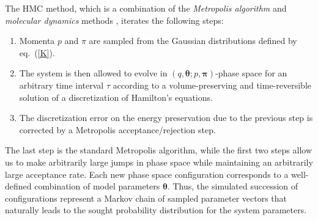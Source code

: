 \documentclass[12pt,a4paper,final]{iopart}
\newcommand{\bt}{\pmb\theta}
\begin{document}
The HMC method, which is a combination of the {\em Metropolis algorithm} \cite{metropolis_1953} and {\em molecular dynamics} methods \cite{alder_1959_MD, rahman_1964_MD}, iterates the following steps:
\begin{enumerate}
  \item
  Momenta $p$ and $\pi$ are sampled from the Gaussian distributions defined by eq.~(\ref{K}).
  \item
  The system is then allowed to evolve in $\left(q,\bt; p,{\pmb\pi}\right)$-phase space for an arbitrary time interval $\tau$ according to a volume-preserving and time-reversible solution of a discretization of Hamilton's equations.
  \item
  The discretization error on the energy preservation due to the previous step is corrected by a Metropolis acceptance/rejection step.
\end{enumerate}
The last step is the standard Metropolis algorithm, while the first two steps allow us to make arbitrarily large jumps in phase space while maintaining an arbitrarily large acceptance rate. Each new phase space configuration corresponds to a well-defined combination of model parameters $\bt$. Thus, the simulated succession of configurations represent a Markov chain of sampled parameter vectors that naturally leads to the sought probability distribution for the system parameters.
\end{document}

